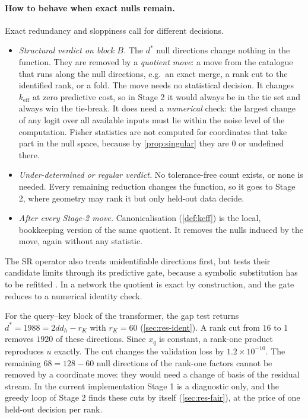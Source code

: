 \documentclass[11pt,a4paper]{article}
\theoremstyle{definition}
\newcommand{\keff}{k_{\mathrm{eff}}}
\begin{document}
\paragraph{How to behave when exact nulls remain.} Exact redundancy and sloppiness call
for different decisions.
\begin{itemize}
\item \emph{Structural verdict on block $B$.} The $d^\ast$ null directions change
nothing in the function. They are removed by a \emph{quotient move}: a move from the
catalogue that runs along the null directions, e.g.\ an exact merge, a rank cut to the
identified rank, or a fold. The move needs no statistical decision. It changes $\keff$
at zero predictive cost, so in Stage 2 it would always be in the tie set and always win
the tie-break. It does need a \emph{numerical} check: the largest change of any logit
over all available inputs must lie within the noise level of the computation. Fisher
statistics are not computed for coordinates that take part in the null space, because
by \cref{prop:singular} they are $0$ or undefined there.
\item \emph{Under-determined or regular verdict.} No tolerance-free count exists, or
none is needed. Every remaining reduction changes the function, so it goes to Stage 2,
where geometry may rank it but only held-out data decide.
\item \emph{After every Stage-2 move.} Canonicalisation (\cref{def:keff}) is the local,
bookkeeping version of the same quotient. It removes the nulls induced by the move,
again without any statistic.
\end{itemize}
The SR operator also treats unidentifiable directions first, but tests their candidate
limits through its predictive gate, because a symbolic substitution has to be refitted
\citep{guidetti2026emergent}. In a network the quotient is exact by construction, and
the gate reduces to a numerical identity check.

For the query--key block of the transformer, the gap test returns $d^\ast=1988=2dd_h-r_K$
with $r_K=60$ (\cref{sec:res-ident}). A rank cut from $16$ to $1$ removes $1920$ of these
directions. Since $x_q$ is constant, a rank-one product reproduces $u$ exactly. The
cut changes the validation loss by $1.2\times10^{-10}$. The remaining $68=128-60$ null
directions of the rank-one factors cannot be removed by a coordinate move: they would
need a change of basis of the residual stream. In the current implementation Stage 1 is
a diagnostic only, and the greedy loop of Stage 2 finds these cuts by itself
(\cref{sec:res-fair}), at the price of one held-out decision per rank.
\end{document}
